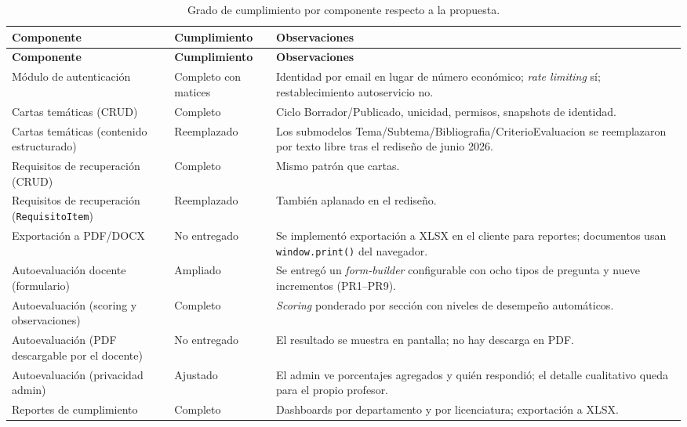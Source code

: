 \begin{longtable}{p{} p{} p{}}
    \caption{Grado de cumplimiento por componente respecto a la propuesta.}
    \label{tab:cumplimiento}\\
    \toprule
    \textbf{Componente} & \textbf{Cumplimiento} & \textbf{Observaciones} \\
    \midrule
    \endfirsthead

    \toprule
    \textbf{Componente} & \textbf{Cumplimiento} & \textbf{Observaciones} \\
    \midrule
    \endhead

    Módulo de autenticación & Completo con matices & Identidad por email en lugar de número económico; \emph{rate limiting} sí; restablecimiento autoservicio no. \\
    \midrule
    Cartas temáticas (CRUD) & Completo & Ciclo Borrador/Publicado, unicidad, permisos, snapshots de identidad. \\
    \midrule
    Cartas temáticas (contenido estructurado) & Reemplazado & Los submodelos Tema/Subtema/Bibliografia/CriterioEvaluacion se reemplazaron por texto libre tras el rediseño de junio 2026. \\
    \midrule
    Requisitos de recuperación (CRUD) & Completo & Mismo patrón que cartas. \\
    \midrule
    Requisitos de recuperación (\texttt{RequisitoItem}) & Reemplazado & También aplanado en el rediseño. \\
    \midrule
    Exportación a PDF/DOCX & No entregado & Se implementó exportación a XLSX en el cliente para reportes; documentos usan \texttt{window.print()} del navegador. \\
    \midrule
    Autoevaluación docente (formulario) & Ampliado & Se entregó un \emph{form-builder} configurable con ocho tipos de pregunta y nueve incrementos (PR1--PR9). \\
    \midrule
    Autoevaluación (scoring y observaciones) & Completo & \emph{Scoring} ponderado por sección con niveles de desempeño automáticos. \\
    \midrule
    Autoevaluación (PDF descargable por el docente) & No entregado & El resultado se muestra en pantalla; no hay descarga en PDF. \\
    \midrule
    Autoevaluación (privacidad admin) & Ajustado & El admin ve porcentajes agregados y quién respondió; el detalle cualitativo queda para el propio profesor. \\
    \midrule
    Reportes de cumplimiento & Completo & Dashboards por departamento y por licenciatura; exportación a XLSX. \\

\end{longtable}
